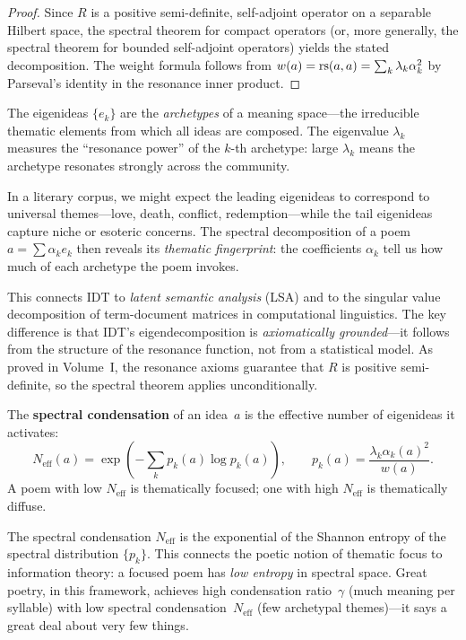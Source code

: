 \begin{proof}
Since $R$ is a positive semi-definite, self-adjoint operator on a
separable Hilbert space, the spectral theorem for compact operators
(or, more generally, the spectral theorem for bounded self-adjoint
operators) yields the stated decomposition.  The weight formula follows
from $w(a) = \mathrm{rs}(a,a) = \sum_k \lambda_k \alpha_k^2$ by Parseval's
identity in the resonance inner product.
\end{proof}

\begin{interpretation}
The eigenideas $\{e_k\}$ are the \emph{archetypes} of a meaning
space---the irreducible thematic elements from which all ideas are
composed.  The eigenvalue $\lambda_k$ measures the ``resonance power''
of the $k$-th archetype: large $\lambda_k$ means the archetype
resonates strongly across the community.

In a literary corpus, we might expect the leading eigenideas to
correspond to universal themes---love, death, conflict, redemption---while
the tail eigenideas capture niche or esoteric concerns.  The spectral
decomposition of a poem $a = \sum \alpha_k e_k$ then reveals its
\emph{thematic fingerprint}: the coefficients $\alpha_k$ tell us how
much of each archetype the poem invokes.

This connects IDT to \emph{latent semantic analysis} (LSA) and to the
singular value decomposition of term-document matrices in computational
linguistics.  The key difference is that IDT's eigendecomposition is
\emph{axiomatically grounded}---it follows from the structure of the
resonance function, not from a statistical model.  As proved in
Volume~I, the resonance axioms guarantee that $R$ is positive
semi-definite, so the spectral theorem applies unconditionally.
\end{interpretation}

\begin{definition}
\label{def:spectral-condensation}
The \textbf{spectral condensation} of an idea~$a$ is the effective
number of eigenideas it activates:
\[
  N_{\mathrm{eff}}(a) = \exp\left(-\sum_k p_k(a) \log p_k(a)\right),
  \qquad p_k(a) = \frac{\lambda_k \alpha_k(a)^2}{w(a)}.
\]
A poem with low $N_{\mathrm{eff}}$ is thematically focused; one with
high $N_{\mathrm{eff}}$ is thematically diffuse.
\end{definition}

\begin{remark}
The spectral condensation $N_{\mathrm{eff}}$ is the exponential of the
Shannon entropy of the spectral distribution $\{p_k\}$.  This connects
the poetic notion of thematic focus to information theory: a focused
poem has \emph{low entropy} in spectral space.  Great poetry, in this
framework, achieves high condensation ratio~$\gamma$ (much meaning per
syllable) with low spectral condensation~$N_{\mathrm{eff}}$ (few
archetypal themes)---it says a great deal about very few things.
\end{remark}



